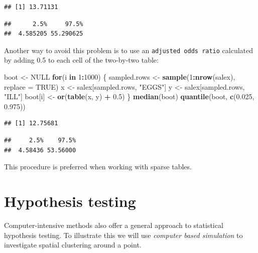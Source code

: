 \documentclass[12pt,a4paper]{book}
\newenvironment{Shaded}{\begin{snugshade}}{\end{snugshade}}
\newcommand{\KeywordTok}[1]{\textcolor[rgb]{0.13,0.29,0.53}{\textbf{#1}}}
\newcommand{\DataTypeTok}[1]{\textcolor[rgb]{0.13,0.29,0.53}{#1}}
\newcommand{\DecValTok}[1]{\textcolor[rgb]{0.00,0.00,0.81}{#1}}
\newcommand{\FloatTok}[1]{\textcolor[rgb]{0.00,0.00,0.81}{#1}}
\newcommand{\StringTok}[1]{\textcolor[rgb]{0.31,0.60,0.02}{#1}}
\newcommand{\OtherTok}[1]{\textcolor[rgb]{0.56,0.35,0.01}{#1}}
\newcommand{\ControlFlowTok}[1]{\textcolor[rgb]{0.13,0.29,0.53}{\textbf{#1}}}
\newcommand{\OperatorTok}[1]{\textcolor[rgb]{0.81,0.36,0.00}{\textbf{#1}}}
\newcommand{\NormalTok}[1]{#1}
\theoremstyle{definition}
\theoremstyle{definition}
\theoremstyle{definition}
\theoremstyle{remark}
\begin{document}
\begin{verbatim}
## [1] 13.71131
\end{verbatim}

\begin{verbatim}
##      2.5%     97.5% 
##  4.585205 55.290625
\end{verbatim}

Another way to avoid this problem is to use an
\texttt{adjusted\ odds\ ratio} calculated by adding 0.5 to each cell of
the two-by-two table:

\begin{Shaded}
\begin{Highlighting}[]
\NormalTok{boot <-}\StringTok{ }\OtherTok{NULL}
\ControlFlowTok{for}\NormalTok{(i }\ControlFlowTok{in} \DecValTok{1}\OperatorTok{:}\DecValTok{1000}\NormalTok{) \{}
\NormalTok{  sampled.rows <-}\StringTok{ }\KeywordTok{sample}\NormalTok{(}\DecValTok{1}\OperatorTok{:}\KeywordTok{nrow}\NormalTok{(salex), }\DataTypeTok{replace =} \OtherTok{TRUE}\NormalTok{)}
\NormalTok{  x <-}\StringTok{ }\NormalTok{salex[sampled.rows, }\StringTok{"EGGS"}\NormalTok{]}
\NormalTok{  y <-}\StringTok{ }\NormalTok{salex[sampled.rows, }\StringTok{"ILL"}\NormalTok{]}
\NormalTok{  boot[i] <-}\StringTok{ }\KeywordTok{or}\NormalTok{(}\KeywordTok{table}\NormalTok{(x, y) }\OperatorTok{+}\StringTok{ }\FloatTok{0.5}\NormalTok{)}
\NormalTok{  \}}
\KeywordTok{median}\NormalTok{(boot)}
\KeywordTok{quantile}\NormalTok{(boot, }\KeywordTok{c}\NormalTok{(}\FloatTok{0.025}\NormalTok{, }\FloatTok{0.975}\NormalTok{))}
\end{Highlighting}
\end{Shaded}

\begin{verbatim}
## [1] 12.75681
\end{verbatim}

\begin{verbatim}
##     2.5%    97.5% 
##  4.58436 53.56000
\end{verbatim}

This procedure is preferred when working with sparse tables.

\hypertarget{hypothesis-testing}{%
\section{Hypothesis testing}\label{hypothesis-testing}}

Computer-intensive methods also offer a general approach to statistical
hypothesis testing. To illustrate this we will use \emph{computer based
simulation} to investigate spatial clustering around a point.
\end{document}
